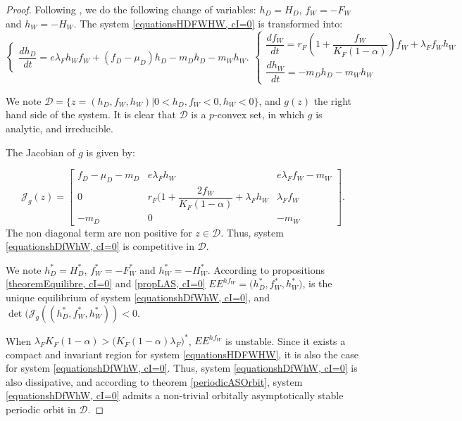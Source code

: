\documentclass{article}
\newcommand{\lfw}{\lambda_{F}}
\newcommand{\lfw}{\lambda_{F}}
\begin{document}
\begin{proof}
Following \cite{wang_predator-prey_1997}, we do the following change of variables: $h_D =  H_D$, $f_W = -F_W$ and $h_W = -H_W$.  The system \eqref{equationsHDFWHW, cI=0} is transformed into:
\begin{subequations}
\begin{equation}
\left\{ \begin{array}{l}
\dfrac{dh_D}{dt}= e\lfw h_W f_W + (f_D - \mu_D) h_D - m_D h_D - m_W h_W.
\end{array}\right.
\end{equation}
\begin{equation}
\left\lbrace \begin{array}{l}
\dfrac{df_W}{dt} = r_F \left(1 + \dfrac{f_W}{K_F(1-\alpha)} \right) f_W + \lfw f_W h_W \\
\dfrac{dh_W}{dt}= -m_D h_D - m_W h_W 
\end{array} \right.
\end{equation}
\label{equationshDfWhW, cI=0}
\end{subequations}

We note $\mathcal{D} = \Big\{z = (h_D, f_W, h_W) | 0 < h_D, f_W < 0, h_W < 0 \Big\}$, and $g(z)$ the right hand side of the system. It is clear that $\mathcal{D}$ is a $p$-convex set, in which $g$ is analytic, and irreducible.

The Jacobian of $g$ is given by:

\begin{equation*}
\mathcal{J}_g(z) = \begin{bmatrix}
f_D -\mu_D - m_D & e \lfw h_W & e \lfw f_W - m_W \\
0 & r_F \Big(1 + \dfrac{2 f_W}{K_F(1-\alpha)} + \lfw h_W & \lfw f_W \\
-m_D & 0 & -m_W
\end{bmatrix}.
\end{equation*}
The non diagonal term are non positive for $z \in \mathcal{D}$. Thus, system \eqref{equationshDfWhW, cI=0} is competitive in $\mathcal{D}$.

We note $h_D^* = H_D^*$, $f_W^* = -F_W^*$ and $h_W^* = -H_W^*$. According to propositions \ref{theoremEquilibre, cI=0} and \ref{propLAS, cI=0}  $EE^{hf_W} = \Big(h_D^*, f_W^*, h_W^* \Big)$, is the unique equilibrium of system \eqref{equationshDfWhW, cI=0}, and $\det(\mathcal{J}_g((h_D^*, f_W^*,h_W^*)) < 0$. 

When $\lfw K_F(1-\alpha) > \Big(K_F(1-\alpha) \lfw \Big)^*$, $EE^{hf_W}$ is unstable. Since it exists a compact and invariant region for system \eqref{equationsHDFWHW}, it is also the case for system \eqref{equationshDfWhW, cI=0}. Thus, system \eqref{equationshDfWhW, cI=0} is also dissipative, and according to theorem \ref{periodicASOrbit}, system \eqref{equationshDfWhW, cI=0} admits a non-trivial orbitally asymptotically stable  periodic orbit in $\mathcal{D}$. 


\end{proof}
\end{document}
